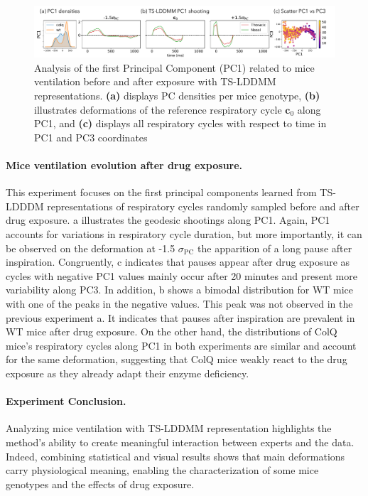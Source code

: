 \begin{figure}[t]
  \centering
  \includegraphics[width=\linewidth]{pictures/exp after/exp after.pdf}
  \caption{Analysis of the first Principal Component (PC1) related to mice ventilation before and after exposure with TS-LDDMM representations. \textbf{(a)} displays PC densities per mice genotype, \textbf{(b)} illustrates deformations of the reference respiratory cycle $\mathbf{c}_0$ along PC1, and \textbf{(c)} displays all respiratory cycles with respect to time in PC1 and PC3 coordinates}
  \label{fig:exp_2_PCA}
  \vspace{-1.5em}
\end{figure}
\vspace{-1ex}

\paragraph{Mice ventilation evolution after drug exposure.} 
This experiment focuses on the first principal components learned from TS-LDDDM representations of respiratory cycles randomly sampled before and after drug exposure. a illustrates the geodesic shootings along PC1. Again, PC1 accounts for variations in respiratory cycle duration, but more importantly, it can be observed on the deformation at -1.5 $\sigma_{\text{PC}}$ the apparition of a long pause after inspiration. Congruently, c indicates that pauses appear after drug exposure as cycles with negative PC1 values mainly occur after 20 minutes and present more variability along PC3. In addition, b shows a bimodal distribution for WT mice with one of the peaks in the negative values. This peak was not observed in the previous experiment a. It indicates that pauses after inspiration are prevalent in WT mice after drug exposure. On the other hand, the distributions of ColQ mice's respiratory cycles along PC1 in both experiments are similar and account for the same deformation, suggesting that ColQ mice weakly react to the drug exposure as they already adapt their enzyme deficiency. 
\vspace{-1ex}

\paragraph{Experiment Conclusion.}
Analyzing mice ventilation with TS-LDDMM representation highlights the method's ability to create meaningful interaction between experts and the data. Indeed, combining statistical and visual results shows that main deformations carry physiological meaning, enabling the characterization of some mice genotypes and the effects of drug exposure. 


